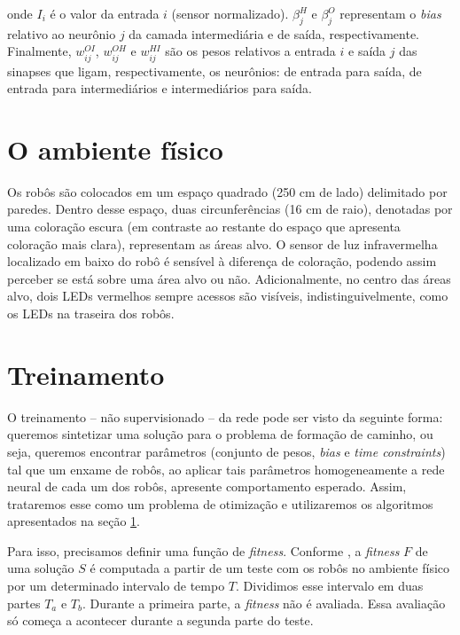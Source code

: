 onde $I_{i}$ é o valor da entrada $i$ (sensor normalizado). $\beta_{j}^{H}$ e $\beta_{j}^{O}$  representam o \textit{bias} relativo ao neurônio $j$ da camada intermediária e de saída, respectivamente. Finalmente, $w_{ij}^{OI}$, $w_{ij}^{OH}$ e $w_{ij}^{HI}$ são os pesos relativos a entrada $i$ e saída $j$ das sinapses que ligam, respectivamente, os neurônios: de entrada para saída, de entrada para intermediários e intermediários para saída.


\section{O ambiente físico}

Os robôs são colocados em um espaço quadrado (250 cm de lado) delimitado por paredes. Dentro desse espaço, duas circunferências (16 cm de raio), denotadas por uma coloração escura (em contraste ao restante do espaço que apresenta coloração mais clara), representam as áreas alvo. O sensor de luz infravermelha localizado em baixo do robô é sensível à diferença de coloração, podendo assim perceber se está sobre uma área alvo ou não. Adicionalmente, no centro das áreas alvo, dois LEDs vermelhos sempre acessos são visíveis, indistinguivelmente, como os LEDs na traseira dos robôs.

\section{Treinamento}
\label{sec:training}

O treinamento -- não supervisionado -- da rede pode ser visto da seguinte forma: queremos sintetizar uma solução para o problema de formação de caminho, ou seja, queremos encontrar parâmetros (conjunto de pesos, \textit{bias} e \textit{time constraints}) tal que um enxame de robôs, ao aplicar tais parâmetros homogeneamente a rede neural de cada um dos robôs, apresente comportamento esperado. Assim, trataremos esse como um problema de otimização e utilizaremos os algoritmos apresentados na seção \ref{}.

Para isso, precisamos definir uma função de \textit{fitness}. Conforme \cite{sperati2011path}, a \textit{fitness} $F$ de uma solução $S$ é computada a partir de um teste com os robôs no ambiente físico por um determinado intervalo de tempo $T$. Dividimos esse intervalo em duas partes $T_{a}$ e $T_{b}$. Durante a primeira parte, a \textit{fitness} não é avaliada. Essa avaliação só começa a acontecer durante a segunda parte do teste.

